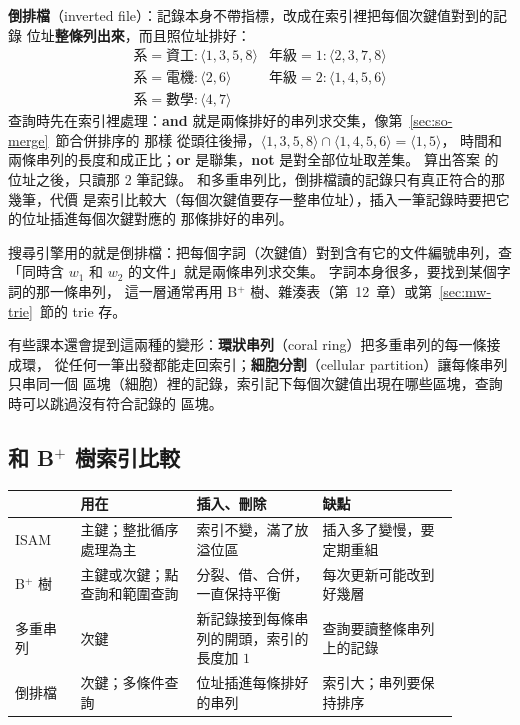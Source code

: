 \textbf{倒排檔}（inverted file）：記錄本身不帶指標，改成在索引裡把每個次鍵值對到的記錄
位址\textbf{整條列出來}，而且照位址排好：
\[
\begin{array}{ll}
\text{系} = \text{資工}: \langle 1, 3, 5, 8 \rangle &
\text{年級} = 1: \langle 2, 3, 7, 8 \rangle \\
\text{系} = \text{電機}: \langle 2, 6 \rangle &
\text{年級} = 2: \langle 1, 4, 5, 6 \rangle \\
\text{系} = \text{數學}: \langle 4, 7 \rangle &
\end{array}
\]
查詢時先在索引裡處理：\textbf{and} 就是兩條排好的串列求交集，像第~\ref{sec:so-merge}~節合併排序的  那樣
從頭往後掃，$\langle 1, 3, 5, 8 \rangle \cap \langle 1, 4, 5, 6 \rangle = \langle 1, 5 \rangle$，
時間和兩條串列的長度和成正比；\textbf{or} 是聯集，\textbf{not} 是對全部位址取差集。 算出答案
的位址之後，只讀那 $2$ 筆記錄。 和多重串列比，倒排檔讀的記錄只有真正符合的那幾筆，代價
是索引比較大（每個次鍵值要存一整串位址），插入一筆記錄時要把它的位址插進每個次鍵對應的
那條排好的串列。

搜尋引擎用的就是倒排檔：把每個字詞（次鍵值）對到含有它的文件編號串列，查「同時含
$w_1$ 和 $w_2$ 的文件」就是兩條串列求交集。 字詞本身很多，要找到某個字詞的那一條串列，
這一層通常再用 B$^{+}$ 樹、雜湊表（第~12~章）或第~\ref{sec:mw-trie}~節的 trie 存。

有些課本還會提到這兩種的變形：\textbf{環狀串列}（coral ring）把多重串列的每一條接成環，
從任何一筆出發都能走回索引；\textbf{細胞分割}（cellular partition）讓每條串列只串同一個
區塊（細胞）裡的記錄，索引記下每個次鍵值出現在哪些區塊，查詢時可以跳過沒有符合記錄的
區塊。

\subsection{和 \texorpdfstring{B$^{+}$}{B+} 樹索引比較}

\begin{center}
\small
\begin{tabular}{p{0.13\linewidth}p{0.23\linewidth}p{0.25\linewidth}p{0.27\linewidth}}
\toprule
 & 用在 & 插入、刪除 & 缺點 \\
\midrule
ISAM & 主鍵；整批循序處理為主 & 索引不變，滿了放溢位區 & 插入多了變慢，要定期重組 \\
B$^{+}$ 樹 & 主鍵或次鍵；點查詢和範圍查詢 & 分裂、借、合併，一直保持平衡 & 每次更新可能改到好幾層 \\
多重串列 & 次鍵 & 新記錄接到每條串列的開頭，索引的長度加 $1$ & 查詢要讀整條串列上的記錄 \\
倒排檔 & 次鍵；多條件查詢 & 位址插進每條排好的串列 & 索引大；串列要保持排序 \\
\bottomrule
\end{tabular}
\end{center}

